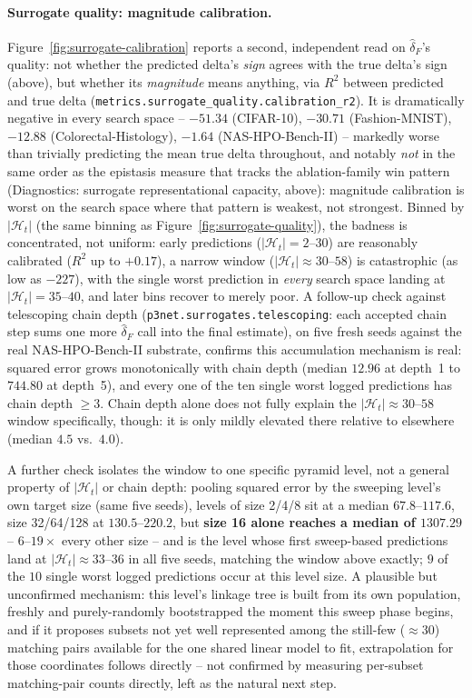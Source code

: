 \paragraph{Surrogate quality: magnitude calibration.} Figure~\ref{fig:surrogate-calibration} reports a
second, independent read on $\hat{\delta}_F$'s quality: not whether the predicted delta's \emph{sign}
agrees with the true delta's sign (above), but whether its \emph{magnitude} means anything, via
$R^2$ between predicted and true delta (\texttt{metrics.surrogate\_quality.calibration\_r2}). It is
dramatically negative in every search space -- $-51.34$ (CIFAR-10), $-30.71$ (Fashion-MNIST), $-12.88$
(Colorectal-Histology), $-1.64$ (NAS-HPO-Bench-II) -- markedly worse than trivially predicting the mean true
delta throughout, and notably \emph{not} in the same order as the epistasis measure that tracks the
ablation-family win pattern (Diagnostics: surrogate representational capacity, above): magnitude
calibration is worst on the search space where that pattern is weakest, not strongest. Binned by
$|\mathcal{H}_t|$ (the same binning as Figure~\ref{fig:surrogate-quality}), the badness is concentrated, not
uniform: early predictions ($|\mathcal{H}_t|=2$--$30$) are reasonably calibrated ($R^2$ up to $+0.17$), a
narrow window ($|\mathcal{H}_t|\approx30$--$58$) is catastrophic (as low as $-227$), with the single worst
prediction in \emph{every} search space landing at $|\mathcal{H}_t|=35$--$40$, and later bins recover to
merely poor. A follow-up check against telescoping chain depth (\texttt{p3net.surrogates.telescoping}: each
accepted chain step sums one more $\hat\delta_F$ call into the final estimate), on five fresh seeds against
the real NAS-HPO-Bench-II substrate, confirms this accumulation mechanism is real: squared error grows
monotonically with chain depth (median $12.96$ at depth~1 to $744.80$ at depth~5), and every one of the ten
single worst logged predictions has chain depth $\geq3$. Chain depth alone does not fully explain the
$|\mathcal{H}_t|\approx30$--$58$ window specifically, though: it is only mildly elevated there relative to
elsewhere (median $4.5$ vs.\ $4.0$).

A further check isolates the window to one specific pyramid level, not a general property of $|\mathcal{H}_t|$
or chain depth: pooling squared error by the sweeping level's own target size (same five seeds), levels of
size 2/4/8 sit at a median $67.8$--$117.6$, size 32/64/128 at $130.5$--$220.2$, but \textbf{size 16 alone
reaches a median of $1307.29$} -- $6$--$19\times$ every other size -- and is the level whose first
sweep-based predictions land at $|\mathcal{H}_t|\approx33$--$36$ in all five seeds, matching the window
above exactly; $9$ of the $10$ single worst logged predictions occur at this level size. A plausible but
unconfirmed mechanism: this level's linkage tree is built from its own population, freshly and
purely-randomly bootstrapped the moment this sweep phase begins, and if it proposes subsets not yet well
represented among the still-few ($\approx30$) matching pairs available for the one shared linear model to
fit, extrapolation for those coordinates follows directly -- not confirmed by measuring per-subset
matching-pair counts directly, left as the natural next step.

